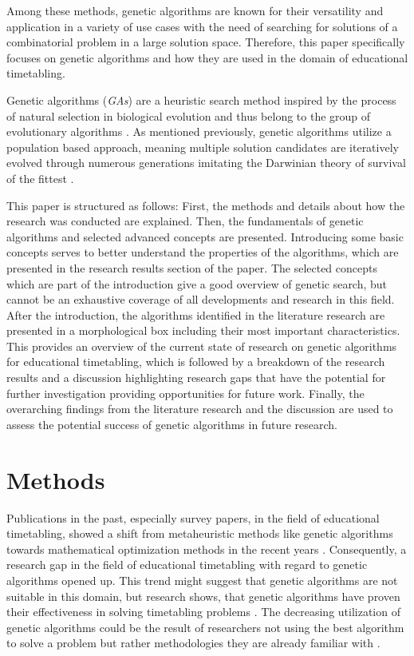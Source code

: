 \documentclass[sigconf]{acmart}
\begin{document}
Among these methods, genetic algorithms are known for their versatility and
application in a variety of use cases with the need of searching for solutions
of a combinatorial problem in a large solution space.
Therefore, this paper specifically focuses on genetic algorithms and how they
are used in the domain of educational timetabling.

Genetic algorithms (\textit{GAs}) are a heuristic search method inspired by
the process of natural selection in biological evolution and thus belong to
the group of evolutionary algorithms \cite{Katoch2021}. As mentioned previously,
genetic algorithms utilize a population based approach, meaning multiple
solution candidates are iteratively evolved through numerous generations
imitating the Darwinian theory of survival of the fittest \cite{Katoch2021}.

This paper is structured as follows:
First, the methods and details about how the research was conducted are
explained.
%
Then, the fundamentals of genetic algorithms and selected advanced concepts
are presented. Introducing some basic concepts serves to better understand the
properties of the algorithms, which are presented in the research results
section of the paper.
The selected concepts which are part of the introduction give a good overview
of genetic search, but cannot be an exhaustive coverage of all developments and
research in this field.
%
After the introduction, the algorithms identified in the literature research
are presented in a morphological box including their most important
characteristics.
This provides an overview of the current state of research on genetic
algorithms for educational timetabling, which is followed by a breakdown of the
research results and a discussion highlighting research gaps that have the
potential for further investigation providing opportunities for future work.
%
Finally, the overarching findings from the literature research and the
discussion are used to assess the potential success of genetic algorithms in
future research.


\section{Methods}
Publications in the past, especially survey papers, in the field of educational
timetabling, showed a shift from metaheuristic methods like genetic algorithms
towards mathematical optimization methods in the recent years
\cite{Tan2021}.
%
Consequently, a research gap in the field of educational timetabling
with regard to genetic algorithms opened up.
%
This trend might suggest that genetic algorithms are not suitable in this
domain, but research shows, that genetic algorithms have proven their
effectiveness in solving timetabling problems \cite{Rezaeipanah2019,Chen2021}.
%
The decreasing utilization of genetic algorithms could be the result of
researchers not using the best algorithm to solve a problem but rather
methodologies they are already familiar with \cite{Ceschia2023}.
\end{document}
